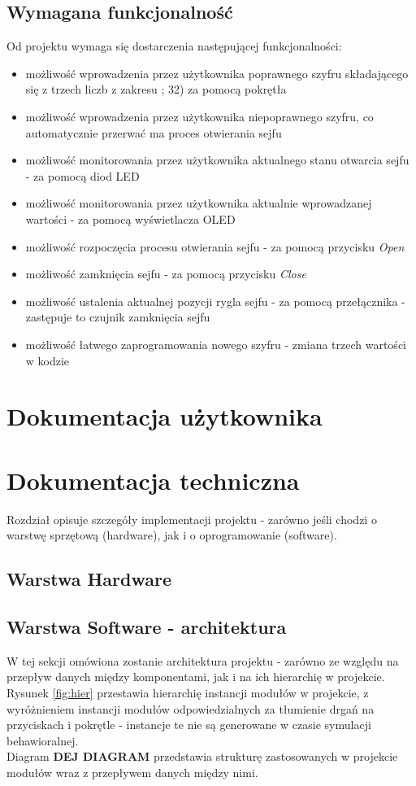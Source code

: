 \documentclass[12pt] {article}
\begin{document}
\subsection{Wymagana funkcjonalność}
Od projektu wymaga się dostarczenia następującej funkcjonalności:
\begin{itemize}
\item możliwość wprowadzenia przez użytkownika poprawnego szyfru składającego się z trzech liczb z zakresu ; 32) za pomocą pokrętła
\item możliwość wprowadzenia przez użytkownika niepoprawnego szyfru, co automatycznie przerwać ma proces otwierania sejfu
\item możliwość monitorowania przez użytkownika aktualnego stanu otwarcia sejfu - za pomocą diod LED
\item możliwość monitorowania przez użytkownika aktualnie wprowadzanej wartości - za pomocą wyświetlacza OLED
\item możliwość rozpoczęcia procesu otwierania sejfu - za pomocą przycisku \textit{Open}
\item możliwość zamknięcia sejfu - za pomocą przycisku \textit{Close}
\item możliwość ustalenia aktualnej pozycji rygla sejfu - za pomocą przełącznika - zastępuje to czujnik zamknięcia sejfu
\item możliwość łatwego zaprogramowania nowego szyfru - zmiana trzech wartości w kodzie 
\end{itemize}



\newpage
\section{Dokumentacja użytkownika}



\newpage
\section{Dokumentacja techniczna}
Rozdział opisuje szczegóły implementacji projektu - zarówno jeśli chodzi o warstwę sprzętową (hardware), jak i o oprogramowanie (software).

\subsection{Warstwa Hardware}

\subsection{Warstwa Software - architektura}
W tej sekcji omówiona zostanie architektura projektu - zarówno ze względu na przepływ danych między komponentami, jak i na ich hierarchię w projekcie. \\
Rysunek \ref{fig:hier} przestawia hierarchię instancji modułów w projekcie, z wyróżnieniem instancji modułów odpowiedzialnych za tłumienie drgań na przyciskach i pokrętle - instancje te nie są generowane w czasie symulacji behawioralnej. \\
Diagram \textbf{DEJ DIAGRAM} przedstawia strukturę zastosowanych w projekcie modułów wraz z przepływem danych między nimi. 
\end{document}
